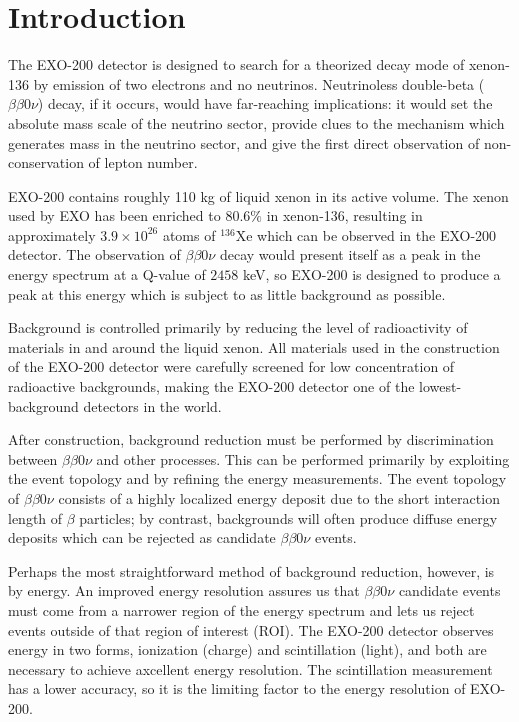 \renewcommand{\thechapter}{1}
\chapter{Introduction}
\label{ch:Introduction}

The EXO-200 detector is designed to search for a theorized decay mode of xenon-136 by emission of two electrons and no neutrinos.  Neutrinoless double-beta ($\beta\beta 0\nu$) decay, if it occurs, would have far-reaching implications: it would set the absolute mass scale of the neutrino sector, provide clues to the mechanism which generates mass in the neutrino sector, and give the first direct observation of non-conservation of lepton number.

EXO-200 contains roughly 110 kg of liquid xenon in its active volume.  The xenon used by EXO has been enriched to $80.6\%$ in xenon-136, resulting in approximately $3.9 \times 10^{26}$ atoms of $^{136}$Xe which can be observed in the EXO-200 detector.  The observation of $\beta\beta 0\nu$ decay would present itself as a peak in the energy spectrum at a Q-value of $2458$ keV, so EXO-200 is designed to produce a peak at this energy which is subject to as little background as possible.

Background is controlled primarily by reducing the level of radioactivity of materials in and around the liquid xenon.  All materials used in the construction of the EXO-200 detector were carefully screened for low concentration of radioactive backgrounds, making the EXO-200 detector one of the lowest-background detectors in the world.

After construction, background reduction must be performed by discrimination between $\beta\beta 0\nu$ and other processes.  This can be performed primarily by exploiting the event topology and by refining the energy measurements.  The event topology of $\beta\beta 0\nu$ consists of a highly localized energy deposit due to the short interaction length of $\beta$ particles; by contrast, backgrounds will often produce diffuse energy deposits which can be rejected as candidate $\beta\beta 0\nu$ events.

Perhaps the most straightforward method of background reduction, however, is by energy.  An improved energy resolution assures us that $\beta\beta 0\nu$ candidate events must come from a narrower region of the energy spectrum and lets us reject events outside of that region of interest (ROI).  The EXO-200 detector observes energy in two forms, ionization (charge) and scintillation (light), and both are necessary to achieve axcellent energy resolution.  The scintillation measurement has a lower accuracy, so it is the limiting factor to the energy resolution of EXO-200.

